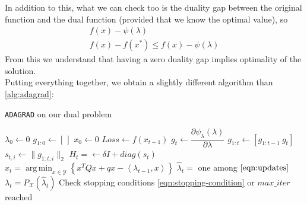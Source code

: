\documentclass[notitlepage]{article}
\DeclareMathOperator*{\argmin}{arg\,min}
\begin{document}
In addition to this, what we can check too is the duality gap between the original function and the dual function (provided that we know the optimal value), so
\begin{gather*}
  f(x) - \psi(\lambda) \\
  f(x) - f(x^*) \le f(x) - \psi(\lambda)
\end{gather*}
From this we understand that having a zero duality gap implies optimality of the solution.\\ 
Putting everything together, we obtain a slightly different algorithm than \ref{alg:adagrad}:
\begin{flushleft}
  \begin{minipage}{.7\textwidth}
    \begin{algorithm}[H]
      \caption{\texttt{ADAGRAD} on our dual problem}
      \label{alg:my_alg}
      \begin{algorithmic}
          \State $\lambda_0 \gets 0$
          \State $g_{1:0} \gets \left[\,\right]$
          \State $x_0 \gets 0$
            \State $Loss \gets f(x_{t-1})$
            \State $g_t \gets \dfrac{\partial \psi_\lambda(\lambda)}{\partial \lambda}$
            \State $g_{1:t} \gets \left[ g_{1:t-1}\ g_t \right]$
            \State $s_{t,i} \gets \| g_{1:t,i} \|_2$
            \State $H_t = \gets \delta \mathit{I} + diag(s_t)$
            \State $x_t = \argmin_{x \in \mathcal{Y}} \left\lbrace x^T Q x + q x - \left\langle \lambda_{t-1},x \right\rangle \right\rbrace$
            \State $\hat{\lambda}_t =$ one among $\eqref{eqn:updates}$
            \State $\lambda_t = P_\mathcal{X}(\hat{\lambda}_t)$ 
            \State Check stopping conditions \eqref{eqn:stopping-condition} or $max\_iter$ reached
          \EndFor
        \EndFunction
      \end{algorithmic}  
    \end{algorithm}
  \end{minipage}
\end{flushleft}
\end{document}
